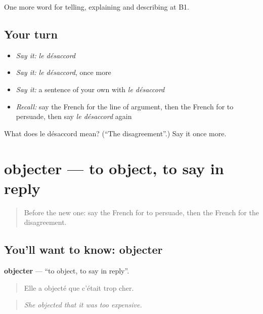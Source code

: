 \begin{grammarlens}[title={What you've built}]
One more word for telling, explaining and describing at B1.
\end{grammarlens}

\subsection*{Your turn}
\begin{itemize}
\raggedright
  \item \emph{Say it:} \emph{le désaccord}
  \item \emph{Say it:} \emph{le désaccord}, once more
  \item \emph{Say it:} a sentence of your own with \emph{le désaccord}
  \item \emph{Recall:} say the French for the line of argument, then the French for to persuade, then say \emph{le désaccord} again
\end{itemize}

\begin{tcolorbox}[breakable,colback=teal!4,colframe=teal!35!black,title={Before you move on}]
What does le désaccord mean? (\textquotedblleft{}The disagreement\textquotedblright{}.) Say it once more.
\end{tcolorbox}
\section[objecter]{objecter — to object, to say in reply}

\label{lesson:FR-C336-objecter}



\begin{quote}
Before the new one: say the French for to persuade, then the French for the disagreement.
\end{quote}

\subsection*{You'll want to know: objecter}
\textbf{objecter} — \textquotedblleft{}to object, to say in reply\textquotedblright{}.

\begin{quote}
Elle a objecté que c'était trop cher.
\end{quote}

\begin{quote}
\emph{She objected that it was too expensive.}
\end{quote}

